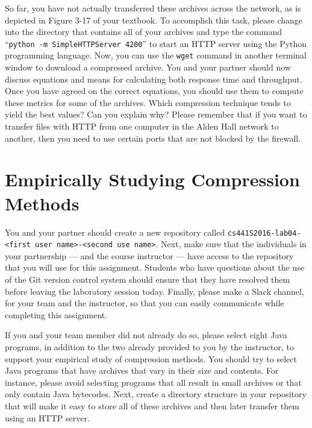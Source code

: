 So far, you have not actually transferred these archives across the network, as is depicted in Figure 3-17 of your
textbook. To accomplish this task, please change into the directory that contains all of your archives and type the
command ``{\tt python -m SimpleHTTPServer 4200}'' to start an HTTP server using the Python programming language. Now,
you can use the {\tt wget} command in another terminal window to download a compressed archive. You and your partner
should now discuss equations and means for calculating both response time and throughput. Once you have agreed on the
correct equations, you should use them to compute these metrics for some of the archives. Which compression technique
tends to yield the best values? Can you explain why? Please remember that if you want to transfer files with HTTP from
one computer in the Alden Hall network to another, then you need to use certain ports that are not blocked by the
firewall.

\section*{Empirically Studying Compression Methods}

You and your partner should create a new repository called {\tt cs441S2016-lab04-<first user name>-<second use
name>}.  Next, make sure that the individuals in your partnership --- and the course instructor --- have access to the
repository that you will use for this assignment.  Students who have questions about the use of the Git version control
system should ensure that they have resolved them before leaving the laboratory session today. Finally, please make a
Slack channel, for your team and the instructor, so that you can easily communicate while completing this assignment.

If you and your team member did not already do so, please select eight Java programs, in addition to the two already
provided to you by the instructor, to support your empirical study of compression methods. You should try to select
Java programs that have archives that vary in their size and contents. For instance, please avoid selecting programs
that all result in small archives or that only contain Java bytecodes. Next, create a directory structure in your
repository that will make it easy to store all of these archives and then later transfer them using an HTTP server.

